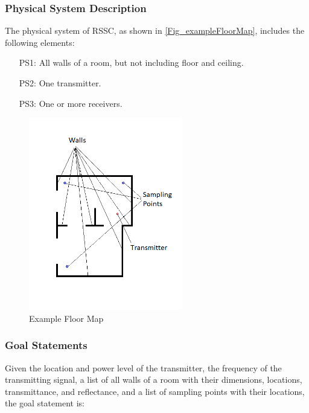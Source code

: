 \documentclass[12pt]{article}
\begin{document}
\subsubsection{Physical System Description} \label{sec_phySystDescrip}

The physical system of RSSC, as shown in \autoref{Fig_exampleFloorMap},
includes the following elements:

\begin{itemize}

\item[PS1:] All walls of a room, but not including floor and ceiling.

\item[PS2:] One transmitter.

\item[PS3:] One or more receivers.

\end{itemize}

\begin{figure}[h!]
\begin{center}
 \includegraphics[width=0.6\textwidth]{floorPlan}
\caption{Example Floor Map}
\label{Fig_exampleFloorMap} 
\end{center}
\end{figure}


\subsubsection{Goal Statements} \label{gGoalStatement}

\noindent Given the location and power level of the transmitter, the frequency of the transmitting signal, a list of all walls of a room with their dimensions, locations, transmittance, and reflectance, and a list of sampling points with their locations, the goal statement is:
\end{document}
